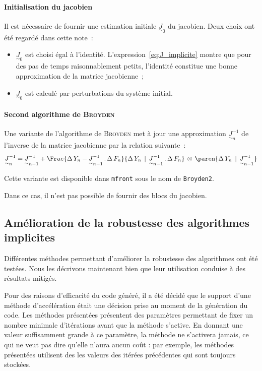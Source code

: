 \documentclass[rectoverso,pleiades,pstricks,leqno,anti]{texmf/note_technique_2010}
\newcommand{\mfront}{\texttt{mfront}}
\begin{document}
\paragraph{Initialisation du jacobien} Il est nécessaire de fournir une
estimation initiale \(\underset{\sim}{J}_{0}\) du jacobien. Deux choix
ont été regardé dans cette note~:
\begin{itemize}
  \item \(\underset{\sim}{J}_{0}\) est choisi égal à l'identité.
  L'expression~\eqref{eq:J_implicite} montre que pour des pas de temps
  raisonnablement petits, l'identité constitue une bonne approximation
  de la matrice jacobienne~;
  \item \(\underset{\sim}{J}_{0}\) est calculé par perturbations du
  système initial.
\end{itemize}

\paragraph{Second algorithme de \textsc{Broyden}}
Une variante de l'algorithme de \textsc{Broyden} met à jour une
approximation \(\underset{\sim}{J}_{n}^{-1}\) de l'inverse de la matrice
jacobienne par la relation suivante~:
\begin{equation}
  \label{eq:Broyden2}
  \underset{\sim}{J}_{n}^{-1} =
  \underset{\sim}{J}_{n-1}^{-1}+\Frac{\Delta\,Y_{n}-\underset{\sim}{J}_{n-1}^{-1}\,.\,\Delta\,F_{n}}{\Delta\,Y_{n}\,\mid\,\underset{\sim}{J}_{n-1}^{-1}\,.\,\Delta\,F_{n}}\,\otimes\,\paren{\Delta\,Y_{n}\,\mid\,\underset{\sim}{J}_{n-1}^{-1}}
\end{equation}
  
Cette variante est disponible dans \mfront{} sous le nom de
\texttt{Broyden2}.

Dans ce cas, il n'est pas possible de fournir des blocs du jacobien.

\subsection{Amélioration de la robustesse des algorithmes implicites}

Différentes méthodes permettant d'améliorer la robustesse des
algorithmes ont été testées. Nous les décrivons maintenant bien que leur
utilisation conduise à des résultats mitigés.

Pour des raisons d'efficacité du code généré, il a été décidé que le
support d'une méthode d'accélération était une décision prise au moment
de la génération du code. Les méthodes présentées présentent des
paramètres permettant de fixer un nombre minimale d'itérations avant que
la méthode s'active. En donnant une valeur suffisamment grande à ce
paramètre, la méthode ne s'activera jamais, ce qui ne veut pas dire
qu'elle n'aura aucun coût : par exemple, les méthodes présentées
utilisent des les valeurs des itérées précédentes qui sont toujours
stockées.
\end{document}
